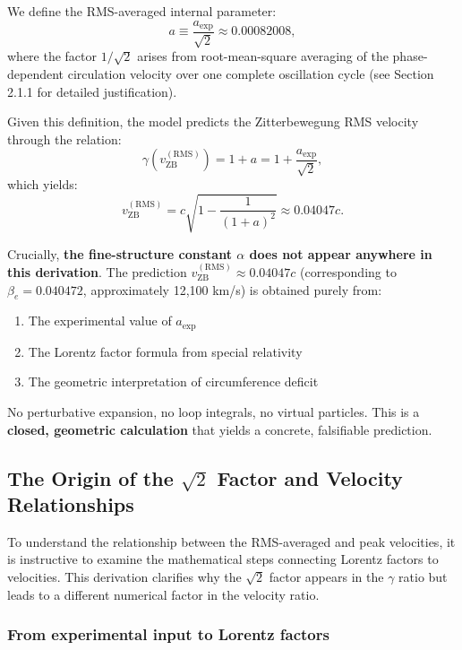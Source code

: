 \documentclass[12pt,letterpaper]{article}
\begin{document}
We define the RMS-averaged internal parameter:
\begin{equation}
a \equiv \frac{a_{\mathrm{exp}}}{\sqrt{2}} \approx 0.00082008,
\end{equation}
where the factor $1/\sqrt{2}$ arises from root-mean-square averaging of the phase-dependent circulation velocity over one complete oscillation cycle (see Section 2.1.1 for detailed justification).

Given this definition, the model predicts the Zitterbewegung RMS velocity through the relation:
\begin{equation}
\gamma(v_{\mathrm{ZB}}^{(\mathrm{RMS})}) = 1 + a = 1 + \frac{a_{\mathrm{exp}}}{\sqrt{2}},
\end{equation}
which yields:
\begin{equation}
v_{\mathrm{ZB}}^{(\mathrm{RMS})} = c \sqrt{1 - \frac{1}{(1 + a)^2}} \approx 0.04047c.
\end{equation}

Crucially, \textbf{the fine-structure constant $\alpha$ does not appear anywhere in this derivation}. The prediction $v_{\mathrm{ZB}}^{(\mathrm{RMS})} \approx 0.04047c$ (corresponding to $\beta_e = 0.040472$, approximately 12,100 km/s) is obtained purely from:
\begin{enumerate}
\item The experimental value of $a_{\mathrm{exp}}$
\item The Lorentz factor formula from special relativity
\item The geometric interpretation of circumference deficit
\end{enumerate}

No perturbative expansion, no loop integrals, no virtual particles. This is a \textbf{closed, geometric calculation} that yields a concrete, falsifiable prediction.

\subsection{The Origin of the $\sqrt{2}$ Factor and Velocity Relationships}

To understand the relationship between the RMS-averaged and peak velocities, it is instructive to examine the mathematical steps connecting Lorentz factors to velocities. This derivation clarifies why the $\sqrt{2}$ factor appears in the $\gamma$ ratio but leads to a different numerical factor in the velocity ratio.

\subsubsection{From experimental input to Lorentz factors}
\end{document}

